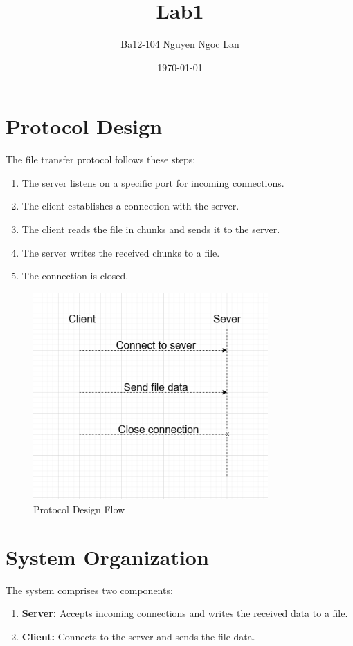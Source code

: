 \documentclass[12pt]{article}
\title{Lab1}
\author{Ba12-104 Nguyen Ngoc Lan}
\date{\today}
\begin{document}
\maketitle

\section{Protocol Design}
The file transfer protocol follows these steps:
\begin{enumerate}
    \item The server listens on a specific port for incoming connections.
    \item The client establishes a connection with the server.
    \item The client reads the file in chunks and sends it to the server.
    \item The server writes the received chunks to a file.
    \item The connection is closed.
\end{enumerate}

\begin{figure}[h]
    \centering
    \includegraphics[width=0.8\textwidth]{1.png}
    \caption{Protocol Design Flow}
    \label{fig:protocol}
\end{figure}

\section{System Organization}
The system comprises two components:
\begin{enumerate}
    \item \textbf{Server:} Accepts incoming connections and writes the received data to a file.
    \item \textbf{Client:} Connects to the server and sends the file data.
\end{enumerate}
\end{document}
